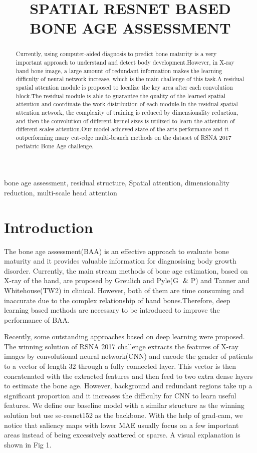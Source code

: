 \documentclass{article}
\title{SPATIAL RESNET BASED BONE AGE ASSESSMENT}
\begin{document}
%
\maketitle
%
\begin{abstract}
Currently, using computer-aided diagnosis to predict bone maturity is a very important approach to understand and detect body development.However, in X-ray hand bone image, a large amount of redundant information makes the learning difficulty of neural network increase, which is the main challenge of this task.A residual spatial attention module is proposed to localize  the key area after each convolution block.The residual module is able to guarantee the quality of the learned spatial attention and coordinate the work distribution of each module.In the residual spatial attention network, the complexity of training is reduced by dimensionality reduction, and then the convolution of different kernel sizes is utilized to learn the attention of different scales attention.Our model achieved state-of-the-arts performance and it outperforming many cut-edge multi-branch methods on the dataset of RSNA 2017 pediatric Bone Age challenge.
\end{abstract}
%
\begin{keywords}
bone age assessment, residual structure, Spatial attention, dimensionality reduction, multi-scale head attention
\end{keywords}
%
\section{Introduction}
\label{sec:intro}
The bone age assessment(BAA) is an effective approach to evaluate bone maturity and it provides valuable information for diagnosising body growth disorder. Currently, the main stream methods of bone age estimation, based on X-ray of the hand, are proposed by Greulich and Pyle(G $\And$P)\cite{greulich1959radiographic} and Tanner and Whitehouse(TW2)\cite{tanner2001assessment} in clinical. However, both of them are time consuming and inaccurate due to the complex relationship of hand bones.Therefore, deep learning based methods are necessary to be introduced to improve the performance of BAA.


Recently, some outstanding approaches based on deep learning were proposed. The winning solution of RSNA 2017 challenge\cite{halabi2019rsna} extracts the features of X-ray images by convolutional neural network(CNN) and encode the gender of patients to a vector of length 32 through a fully connected layer. This vector is then concatenated with the extracted features and then feed to two extra dense layers to estimate the bone age. However, background and redundant regions take up a significant proportion and it increases the difficulty for CNN to learn useful features. We define our baseline model with a similar structure as the winning solution but use se-resnet152\cite{hu2018squeeze} as the backbone. With the help of grad-cam\cite{selvaraju2017grad}, we notice that saliency maps with lower MAE usually focus on a few important areas instead of being excessively scattered or sparse. A visual explanation is shown in Fig 1.
\end{document}
